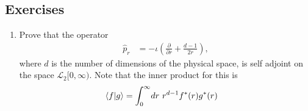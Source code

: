 \subsection*{Exercises}
\begin{enumerate}
    \item 
        Prove that the operator 
        \begin{align*}
            \hat p_r &= -\iota \left( \frac{\partial }{\partial r} + \frac{d-1}{2r}\right),
        \end{align*}
        where $d$ is the number of dimensions of the physical space,
        is self adjoint on the space $\mathcal L_2 [0, \infty)$. Note that the inner product for this is
        \begin{align*}
            \langle f|g\rangle &= \int_{0}^{\infty}\! dr\ r^{d-1} f^*(r) g^*(r)
        \end{align*}
\end{enumerate}

